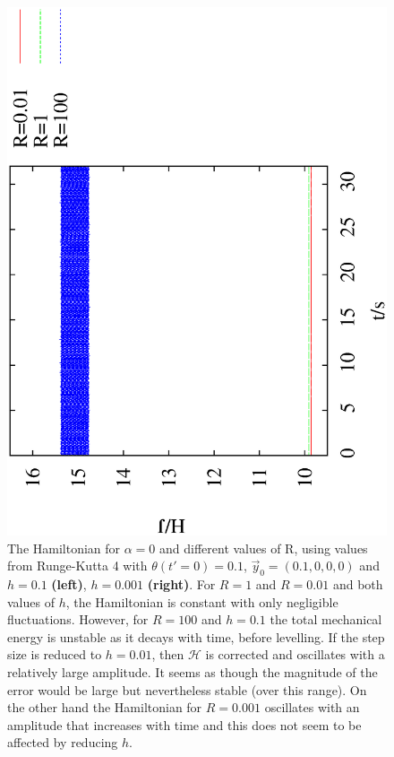 \documentclass[10pt,a4paper]{article}
\begin{document}
\begin{figure}[h!]
\begin{center}
\includegraphics[scale = 0.3, angle =-90]{EnergyTest0.01.eps}
\caption{The Hamiltonian for $\alpha = 0$ and different values of R, using values from Runge-Kutta 4 with $\theta(t' = 0) = 0.1$, $\vec{y}_{0}=(0.1,0,0,0)$  and  $h=0.1$ \textbf{(left)}, $h=0.001$ \textbf{(right)}. For $R=1$ and $R=0.01$ and both values of $h$, the Hamiltonian is constant with only negligible fluctuations. However, for $R=100$ and $h=0.1$ the total mechanical energy is unstable as it decays with time, before levelling. If the step size is reduced to $h=0.01$, then $\mathcal{H}$ is corrected and oscillates with a relatively large amplitude. It seems as though the magnitude of the error would be large but nevertheless stable (over this range). On the other hand the Hamiltonian for $R=0.001$ oscillates with an amplitude that increases with time and this does not seem to be affected by reducing $h$.}
\label{fig:TotalEnergy}
\end{center}
\end{figure}
\newpage
\end{document}
